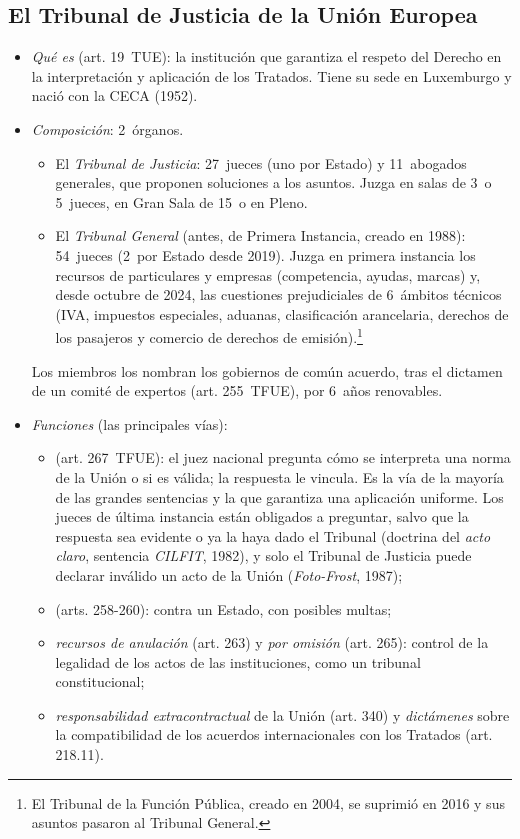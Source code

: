 \documentclass[11pt]{article}
\begin{document}
\subsection{El Tribunal de Justicia de la Unión Europea}\label{sec:tjue}

\begin{itemize}
\item \emph{Qué es} (art. 19~TUE): la institución que garantiza el respeto del Derecho en la interpretación y aplicación de los Tratados. Tiene su sede en Luxemburgo y nació con la CECA (1952).
\item \emph{Composición}: 2~órganos.
  \begin{itemize}
  \item El \emph{Tribunal de Justicia}: 27~jueces (uno por Estado) y 11~abogados generales, que proponen soluciones a los asuntos. Juzga en salas de 3~o 5~jueces, en Gran Sala de 15~o en Pleno.
  \item El \emph{Tribunal General} (antes, de Primera Instancia, creado en 1988): 54~jueces (2~por Estado desde 2019). Juzga en primera instancia los recursos de particulares y empresas (competencia, ayudas, marcas) y, desde octubre de 2024, las cuestiones prejudiciales de 6~ámbitos técnicos (IVA, impuestos especiales, aduanas, clasificación arancelaria, derechos de los pasajeros y comercio de derechos de emisión)\nocite{TJUE2024Prejudiciales}.\footnote{El Tribunal de la Función Pública, creado en 2004, se suprimió en 2016 y sus asuntos pasaron al Tribunal General.}
  \end{itemize}
  Los miembros los nombran los gobiernos de común acuerdo, tras el dictamen de un comité de expertos (art. 255~TFUE), por 6~años renovables.
\item \emph{Funciones} (las principales vías):
  \begin{itemize}
  \item {} (art. 267~TFUE): el juez nacional pregunta cómo se interpreta una norma de la Unión o si es válida; la respuesta le vincula. Es la vía de la mayoría de las grandes sentencias y la que garantiza una aplicación uniforme. Los jueces de última instancia están obligados a preguntar, salvo que la respuesta sea evidente o ya la haya dado el Tribunal (doctrina del \emph{acto claro}, sentencia \emph{CILFIT}, 1982), y solo el Tribunal de Justicia puede declarar inválido un acto de la Unión (\emph{Foto-Frost}, 1987);
  \item {} (arts. 258-260): contra un Estado, con posibles multas;
  \item \emph{recursos de anulación} (art. 263) y \emph{por omisión} (art. 265): control de la legalidad de los actos de las instituciones, como un tribunal constitucional;
  \item \emph{responsabilidad extracontractual} de la Unión (art. 340) y \emph{dictámenes} sobre la compatibilidad de los acuerdos internacionales con los Tratados (art. 218.11).
  \end{itemize}
\end{itemize}
\end{document}
